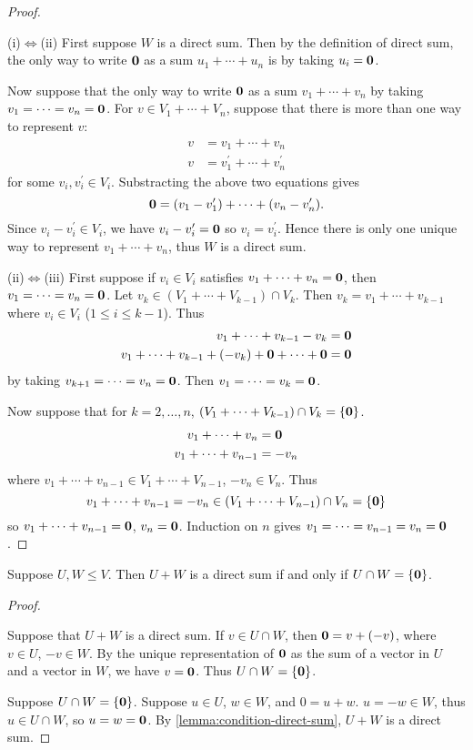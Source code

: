 \begin{proof} \

(i)$\iff$(ii) First suppose $W$ is a direct sum. Then by the definition of direct sum, the only way to write $\vb{0}$ as a sum $u_1+\cdots+u_n$ is by taking $u_i=\vb{0}$.

Now suppose that the only way to write $\vb{0}$ as a sum $v_1+\cdots+v_n$ by taking $v_1=\cdots=v_n=\vb{0}$. For $v\in V_1+\cdots+V_n$, suppose that there is more than one way to represent $v$:
\begin{align*}
v&=v_1+\cdots+v_n\\
v&=v_1^\prime+\cdots+v_n^\prime
\end{align*}
for some $v_i,v_i^\prime\in V_i$. Substracting the above two equations gives
\[\vb{0}=(v_1-v_1^\prime)+\cdots+(v_n-v_n^\prime).\]
Since $v_i-v_i^\prime\in V_i$, we have $v_i-v_i^\prime=\vb{0}$ so $v_i=v_i^\prime$. Hence there is only one unique way to represent $v_1+\cdots+v_n$, thus $W$ is a direct sum.

(ii)$\iff$(iii) First suppose if $v_i\in V_i$ satisfies $v_1+\cdots+v_n=\vb{0}$, then $v_1=\cdots=v_n=\vb{0}$. Let $v_k\in(V_1+\cdots+V_{k-1})\cap V_k$. Then $v_k=v_1+\cdots+v_{k-1}$ where $v_i\in V_i$ ($1\le i\le k-1$). Thus
\begin{align*}
v_1+\cdots+v_{k-1}-v_k&=\vb{0}\\
v_1+\cdots+v_{k-1}+(-v_k)+\vb{0}+\cdots+\vb{0}&=\vb{0}
\end{align*}
by taking $v_{k+1}=\cdots=v_n=\vb{0}$. Then $v_1=\cdots=v_k=\vb{0}$.

Now suppose that for $k=2,\dots,n$, $(V_1+\cdots+V_{k-1})\cap V_k=\{\vb{0}\}$.
\begin{align*}
v_1+\cdots+v_n&=\vb{0}\\
v_1+\cdots+v_{n-1}&=-v_n
\end{align*}
where $v_1+\cdots+v_{n-1}\in V_1+\cdots+V_{n-1}$, $-v_n\in V_n$. Thus
\[v_1+\cdots+v_{n-1}=-v_n\in(V_1+\cdots+V_{n-1})\cap V_n=\{\vb{0}\}\]
so $v_1+\cdots+v_{n-1}=\vb{0}$, $v_n=\vb{0}$. Induction on $n$ gives $v_1=\cdots=v_{n-1}=v_n=\vb{0}$.
\end{proof}

\begin{proposition}
Suppose $U,W\le V$. Then $U+W$ is a direct sum if and only if $U\cap W=\{\vb{0}\}$.
\end{proposition}

\begin{proof} \

\fbox{$\implies$} Suppose that $U+W$ is a direct sum. If $v\in U\cap W$, then $\vb{0}=v+(-v)$, where $v\in U$, $-v\in W$. By the unique representation of $\vb{0}$ as the sum of a vector in $U$ and a vector in $W$, we have $v=\vb{0}$. Thus $U\cap W=\{\vb{0}\}$.

\fbox{$\impliedby$} Suppose $U\cap W=\{\vb{0}\}$. Suppose $u\in U$, $w\in W$, and $0=u+w$. $u=-w\in W$, thus $u\in U\cap W$, so $u=w=\vb{0}$. By \cref{lemma:condition-direct-sum}, $U+W$ is a direct sum.
\end{proof}

